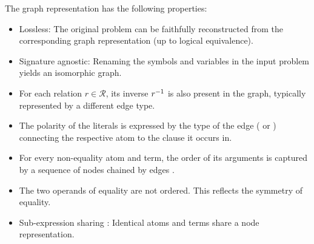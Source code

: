 The graph representation has the following properties:
\begin{itemize}
\item Lossless: The original problem can be faithfully reconstructed from the corresponding graph representation
(up to logical equivalence).
\item Signature agnostic: Renaming the symbols and variables in the input problem yields an isomorphic graph.
\item For each relation $r \in \mathcal{R}$, its inverse $r^{-1}$ is also present in the graph,
typically represented by a different edge type.
\item The polarity of the literals is expressed by the type of the edge (\epos{} or \eneg{})
connecting the respective atom to the clause it occurs in.
\item For every non-equality atom and term, the order of its arguments is captured by a sequence of  nodes chained by edges \cite{Rawson2020}.
\item The two operands of equality are not ordered.
This reflects the symmetry of equality.
\item Sub-expression sharing \cite{Chvalovsky2019,Olsak2019,Rawson2020}:
Identical atoms and terms share a node representation.
\end{itemize}

